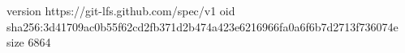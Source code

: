 version https://git-lfs.github.com/spec/v1
oid sha256:3d41709ac0b55f62cd2fb371d2b474a423e6216966fa0a6f6b7d2713f736074e
size 6864
